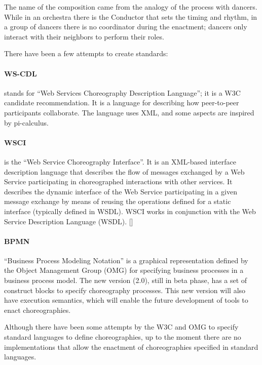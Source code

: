 The name of the composition came from the analogy of the process with dancers. While in an orchestra there is the Conductor that sets the timing and rhythm, in a group of dancers there is no coordinator during the enactment; dancers only interact with their neighbors to perform their roles.

There have been a few attempts to create standards:

\paragraph{WS-CDL}
stands for ``Web Services Choreography Description Language''; it is a W3C candidate recommendation. It is a language for describing how peer-to-peer participants collaborate. The language uses XML, and some aspects are inspired by pi-calculus.

\paragraph{WSCI}
is the ``Web Service Choreography Interface''. It is an XML-based interface description language that describes the flow of messages exchanged by a Web Service participating in choreographed interactions with other services. It describes the dynamic interface of the Web Service participating in a given message exchange by means of reusing the operations defined for a static interface (typically defined in WSDL). WSCI works in conjunction with the Web Service Description Language (WSDL). [\citet{WSCI}]

\paragraph{BPMN}
``Business Process Modeling Notation'' is a graphical representation defined by the Object Management Group (OMG) for specifying business processes in a business process model. The new version (2.0), still in beta phase, has a set of construct blocks to specify choreography processes. This new version will also have execution semantics, which will enable the future development of tools to enact choreographies.

Although there have been some attempts by the W3C and OMG to specify standard languages to define choreographies, up to the moment there are no implementations that allow the enactment of choreographies specified in standard languages.




